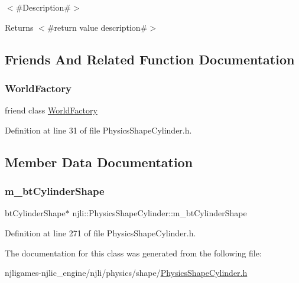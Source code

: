 $<$\#\+Description\#$>$

\begin{DoxyReturn}{Returns}
$<$\#return value description\#$>$ 
\end{DoxyReturn}


\subsection{Friends And Related Function Documentation}
\mbox{\label{classnjli_1_1_physics_shape_cylinder_acb96ebb09abe8f2a37a915a842babfac}} 
\subsubsection{\texorpdfstring{World\+Factory}{WorldFactory}}
{\footnotesize\ttfamily friend class \mbox{\hyperlink{classnjli_1_1_world_factory}{World\+Factory}}\hspace{0.3cm}{\ttfamily [friend]}}



Definition at line 31 of file Physics\+Shape\+Cylinder.\+h.



\subsection{Member Data Documentation}
\mbox{\label{classnjli_1_1_physics_shape_cylinder_a59ebaac81520be5fee6e86ff8b937737}} 
\subsubsection{\texorpdfstring{m\+\_\+bt\+Cylinder\+Shape}{m\_btCylinderShape}}
{\footnotesize\ttfamily bt\+Cylinder\+Shape$\ast$ njli\+::\+Physics\+Shape\+Cylinder\+::m\+\_\+bt\+Cylinder\+Shape\hspace{0.3cm}{\ttfamily [private]}}



Definition at line 271 of file Physics\+Shape\+Cylinder.\+h.



The documentation for this class was generated from the following file\+:\begin{DoxyCompactItemize}
\item 
njligames-\/njlic\+\_\+engine/njli/physics/shape/\mbox{\hyperlink{_physics_shape_cylinder_8h}{Physics\+Shape\+Cylinder.\+h}}\end{DoxyCompactItemize}
